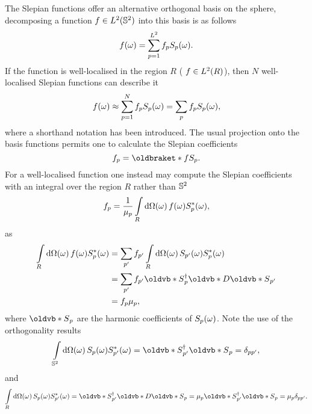 The Slepian functions offer an alternative orthogonal basis on the sphere, decomposing a function \(f \in L^{2}(\mathbb{S}^{2})\) into this basis is as follows
%
\begin{equation}
	f(\omega)
	= \sum\limits_{p=1}^{L^{2}} {f}_{p}{S}_{p}(\omega).
\end{equation}
%
If the function is well-localised in the region \(R\) (\ie{} \(f \in L^{2}(R)\)), then \(N\) well-localised Slepian functions can describe it
%
\begin{equation}\label{eq:chapter3_slepian_inverse}
	f(\omega)
	\approx \sum\limits_{p=1}^{N} {f}_{p}{S}_{p}(\omega) \\
	= \sum\limits_{p} {f}_{p}{S}_{p}(\omega),
\end{equation}
%
where a shorthand notation has been introduced.
The usual projection onto the basis functions permits one to calculate the Slepian coefficients
%
\begin{equation}
	\slepian{f}
	= \braket{f}{\slepian{S}}.
\end{equation}
%
For a well-localised function one instead may compute the Slepian coefficients with an integral over the region \(R\) rather than \(\mathbb{S}^{2}{}\)
%
\begin{equation}
	{f}_{p}
	= \frac{1}{{\mu}_{p}} \int\limits_{R} \dd{\Omega(\omega)} f(\omega) {S}_{p}^{\ast}(\omega),
\end{equation}
%
as
%
\begin{align}
	\integrateRegion{\sphereVolume} \pixel{f} \pixel{\conj{\slepian{S}}}
	 & = \slepianSum['] \slepian[']{f} \integrateRegion{\sphereVolume} \pixel{\slepian[']{S}} \pixel{\conj{\slepian{S}}} \nonumber \\
	 & = \slepianSum['] \slepian[']{f} \slepian{\vb{S}}^{\dagger} \vb{D} \slepian[']{\vb{S}} \nonumber                             \\
	 & = \slepian{f} \slepian{\mu},
\end{align}
%
where \(\slepian{\vb{S}}\) are the harmonic coefficients of \({S}_{p}(\omega)\).
Note the use of the orthogonality results
%
\begin{equation}\label{eq:chapter3_orthogonality_sphere}
	\integrateSphere{\omega} \pixel{\slepian{S}} \pixel{\conj{\slepian[']{S}}}
	= \slepian[']{\vb{S}}^{\dagger} \slepian{\vb{S}}
	= \delta_{pp'},
\end{equation}
%
and
%
\begin{equation}
	\integrateRegion{\sphereVolume} \pixel{\slepian{S}} \pixel{\conj{\slepian[']{S}}}
	= \slepian[']{\vb{S}}^{\dagger} \vb{D} \slepian{\vb{S}}
	= \slepian{\mu} \slepian[']{\vb{S}}^{\dagger} \slepian{\vb{S}}
	= \slepian{\mu} \delta_{pp'}.
\end{equation}


